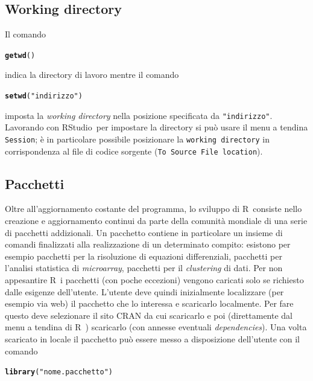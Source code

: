 \documentclass[onecolumn,11pt]{book}\usepackage[]{graphicx}\usepackage[]{color}
\makeatletter
\newcommand{\hlstr}[1]{\textcolor[rgb]{0.192,0.494,0.8}{#1}}%
\newcommand{\hlstd}[1]{\textcolor[rgb]{0.345,0.345,0.345}{#1}}%
\newcommand{\hlkwd}[1]{\textcolor[rgb]{0.737,0.353,0.396}{\textbf{#1}}}%
\newenvironment{kframe}{%
 \def\at@end@of@kframe{}%
 \ifinner\ifhmode%
  \def\at@end@of@kframe{\end{minipage}}%
  \begin{minipage}{\columnwidth}%
 \fi\fi%
 \def\FrameCommand##1{\hskip\@totalleftmargin \hskip-\fboxsep
 \colorbox{shadecolor}{##1}\hskip-\fboxsep
     \hskip-\linewidth \hskip-\@totalleftmargin \hskip\columnwidth}%
 \MakeFramed {\advance\hsize-\width
   \@totalleftmargin\z@ \linewidth\hsize
   \@setminipage}}%
 {\par\unskip\endMakeFramed%
 \at@end@of@kframe}
\newenvironment{knitrout}{}{} %
\newcommand{\rst}{\textsf{RStudio}~}
\newcommand{\rpr}{\textsf{R}~}
\makeatother
\begin{document}
\subsection*{Working directory}
Il comando 
\begin{knitrout}
\color{fgcolor}\begin{kframe}
\begin{alltt}
\hlkwd{getwd}\hlstd{()}
\end{alltt}
\end{kframe}
\end{knitrout}
indica la directory di lavoro mentre il comando
\begin{knitrout}
\color{fgcolor}\begin{kframe}
\begin{alltt}
\hlkwd{setwd}\hlstd{(}\hlstr{"indirizzo"}\hlstd{)}
\end{alltt}
\end{kframe}
\end{knitrout}
 imposta la {\it working directory}  nella posizione specificata da \texttt{"indirizzo"}.
 Lavorando con \rst per impostare la directory si pu\`o usare il menu a tendina
\texttt{Session};  \`e  in particolare  possibile posizionare la \texttt{working directory} in corrispondenza al file di codice sorgente (\texttt{To Source File location}).


\subsection*{Pacchetti}

Oltre all'aggiornamento costante del programma, lo sviluppo di \rpr consiste nello creazione e aggiornamento continui da parte della comunit\`a  mondiale di una serie di pacchetti addizionali. Un pacchetto contiene in particolare un insieme di comandi finalizzati alla  realizzazione di un determinato compito: esistono per esempio pacchetti per la risoluzione di equazioni differenziali, pacchetti per l'analisi statistica di {\it microarray}, pacchetti per il {\it clustering} di dati.  Per non appesantire \rpr i pacchetti (con poche eccezioni) vengono caricati solo se richiesto dalle esigenze dell'utente.
L'utente deve quindi inizialmente localizzare (per esempio via web) il pacchetto che lo interessa e scaricarlo localmente.
Per fare questo deve selezionare il sito CRAN da cui scaricarlo e poi (direttamente dal menu a tendina di \rpr) scaricarlo (con annesse eventuali {\it dependencies}). Una volta scaricato in locale il pacchetto pu\`o essere messo a disposizione dell'utente con il comando
\begin{knitrout}
\color{fgcolor}\begin{kframe}
\begin{alltt}
\hlkwd{library}\hlstd{(}\hlstr{"nome.pacchetto"}\hlstd{)}
\end{alltt}
\end{kframe}
\end{knitrout}
\end{document}
